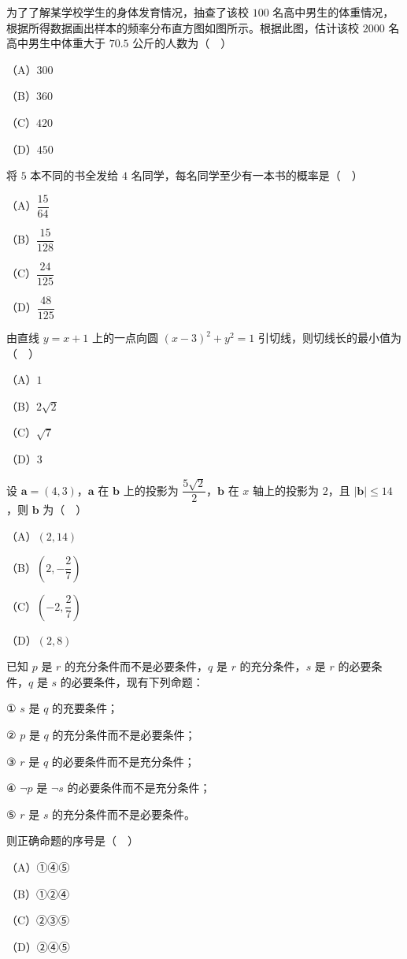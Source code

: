 \begin{question}
为了了解某学校学生的身体发育情况，抽查了该校 $100$ 名高中男生的体重情况，根据所得数据画出样本的频率分布直方图如图所示。根据此图，估计该校 $2000$ 名高中男生中体重大于 $70.5$ 公斤的人数为（　）
\nopagebreak[4]
\begin{center}\end{center}
\nopagebreak[4]
（A）$300$

（B）$360$

（C）$420$

（D）$450$

\end{question}
\begin{question}
将 $5$ 本不同的书全发给 $4$ 名同学，每名同学至少有一本书的概率是（　）

（A）$\dfrac{15}{64}$

（B）$\dfrac{15}{128}$

（C）$\dfrac{24}{125}$

（D）$\dfrac{48}{125}$

\end{question}
\begin{question}
由直线 $y=x+1$ 上的一点向圆 $(x-3)^2+y^2=1$ 引切线，则切线长的最小值为（　）

（A）$1$

（B）$2\sqrt2$

（C）$\sqrt7$

（D）$3$

\end{question}
\begin{question}
设 $\boldsymbol a=(4,3)$，$\boldsymbol a$ 在 $\boldsymbol b$ 上的投影为 $\dfrac{5\sqrt2}{2}$，$\boldsymbol b$ 在 $x$ 轴上的投影为 $2$，且 $|\boldsymbol b|\leqslant14$，则 $\boldsymbol b$ 为（　）

（A）$(2,14)$

（B）$\left(2,-\dfrac27\right)$

（C）$\left(-2,\dfrac27\right)$

（D）$(2,8)$

\end{question}
\begin{question}
已知 $p$ 是 $r$ 的充分条件而不是必要条件，$q$ 是 $r$ 的充分条件，$s$ 是 $r$ 的必要条件，$q$ 是 $s$ 的必要条件，现有下列命题：

① $s$ 是 $q$ 的充要条件；

② $p$ 是 $q$ 的充分条件而不是必要条件；

③ $r$ 是 $q$ 的必要条件而不是充分条件；

④ $\neg p$ 是 $\neg s$ 的必要条件而不是充分条件；

⑤ $r$ 是 $s$ 的充分条件而不是必要条件。

则正确命题的序号是（　）

（A）①④⑤

（B）①②④

（C）②③⑤

（D）②④⑤

\end{question}

